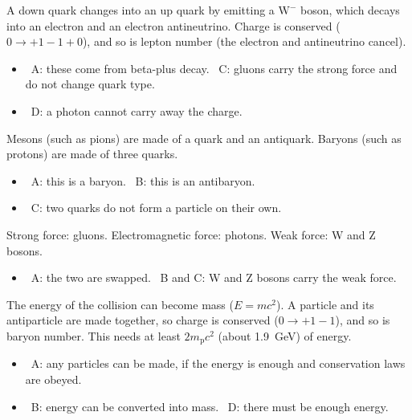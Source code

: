 \documentclass[12pt]{article}
\begin{document}
\begin{practiceanswers}
\begin{practiceans}
  A down quark changes into an up quark by emitting a $\mathrm{W}^-$ boson, which decays into an
  electron and an electron antineutrino. Charge is conserved ($0 \rightarrow +1 - 1 + 0$), and so is lepton
  number (the electron and antineutrino cancel).
  \begin{itemize}
    \item \xmark\ A: these come from beta-plus decay. \quad \xmark\ C: gluons carry the strong force
          and do not change quark type.
    \item \xmark\ D: a photon cannot carry away the charge.
  \end{itemize}
\end{practiceans}

\begin{practiceans}
  Mesons (such as pions) are made of a quark and an antiquark. Baryons (such as protons) are made of
  three quarks.
  \begin{itemize}
    \item \xmark\ A: this is a baryon. \quad \xmark\ B: this is an antibaryon.
    \item \xmark\ C: two quarks do not form a particle on their own.
  \end{itemize}
\end{practiceans}

\begin{practiceans}
  Strong force: gluons. Electromagnetic force: photons. Weak force: W and Z bosons.
  \begin{itemize}
    \item \xmark\ A: the two are swapped. \quad \xmark\ B and C: W and Z bosons carry the weak force.
  \end{itemize}
\end{practiceans}

\begin{practiceans}
  The energy of the collision can become mass ($E = mc^2$). A particle and its antiparticle are made
  together, so charge is conserved ($0 \rightarrow +1 - 1$), and so is baryon number. This needs at least
  $2m_\mathrm{p}c^2$ (about \qty{1.9}{GeV}) of energy.
  \begin{itemize}
    \item \xmark\ A: any particles can be made, if the energy is enough and conservation laws are
          obeyed.
    \item \xmark\ B: energy can be converted into mass. \quad \xmark\ D: there must be enough energy.
  \end{itemize}
\end{practiceans}


\end{practiceanswers}
\end{document}
